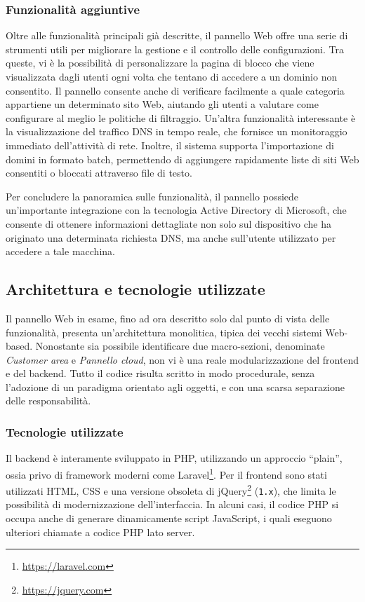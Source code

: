 \subsubsection{Funzionalità aggiuntive}
Oltre alle funzionalità principali già descritte, il pannello Web offre una serie di strumenti utili per migliorare la gestione e il controllo delle configurazioni. Tra queste, vi è la possibilità di personalizzare la pagina di blocco che viene visualizzata dagli utenti ogni volta che tentano di accedere a un dominio non consentito.
%
Il pannello consente anche di verificare facilmente a quale categoria appartiene un determinato sito Web, aiutando gli utenti a valutare come configurare al meglio le politiche di filtraggio.
%
Un’altra funzionalità interessante è la visualizzazione del traffico DNS in tempo reale, che fornisce un monitoraggio immediato dell’attività di rete. Inoltre, il sistema supporta l'importazione di domini in formato batch, permettendo di aggiungere rapidamente liste di siti Web consentiti o bloccati attraverso file di testo.

Per concludere la panoramica sulle funzionalità, il pannello possiede un'importante integrazione con la tecnologia Active Directory di Microsoft, che consente di ottenere informazioni dettagliate non solo sul dispositivo che ha originato una determinata richiesta DNS, ma anche sull’utente utilizzato per accedere a tale macchina.

\subsection{Architettura e tecnologie utilizzate}
Il pannello Web in esame, fino ad ora descritto solo dal punto di vista delle funzionalità, presenta un'architettura monolitica, tipica dei vecchi sistemi Web-based. Nonostante sia possibile identificare due macro-sezioni, denominate \textit{Customer area} e \textit{Pannello cloud}, non vi è una reale modularizzazione del frontend e del backend. Tutto il codice risulta scritto in modo procedurale, senza l’adozione di un paradigma orientato agli oggetti, e con una scarsa separazione delle responsabilità.

\subsubsection{Tecnologie utilizzate}
Il backend è interamente sviluppato in PHP, utilizzando un approccio ``plain'', ossia privo di framework moderni come Laravel\footnote{\url{https://laravel.com}}. Per il frontend sono stati utilizzati HTML, CSS e una versione obsoleta di jQuery\footnote{\url{https://jquery.com}} (\texttt{1.x}), che limita le possibilità di modernizzazione dell'interfaccia. In alcuni casi, il codice PHP si occupa anche di generare dinamicamente script JavaScript, i quali eseguono ulteriori chiamate a codice PHP lato server.

